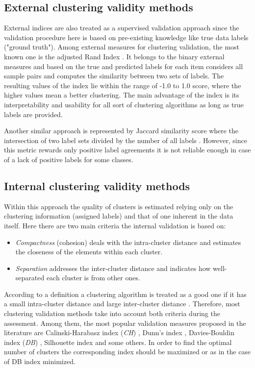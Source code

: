 \documentclass[fontsize=12pt,a4paper,twoside,openany]{scrbook}
\begin{document}
\subsection{External clustering validity methods}
External indices are also treated as a supervised validation approach \parencite{Palacio19} since the validation procedure here is based on pre-existing knowledge like true data labels ("ground truth"). 
Among external measures for clustering validation, the most known one is the adjusted Rand Index \parencite{Hubert85}. It belongs to the binary external measures \parencite{Handl05} and based on the true and predicted labels for each item considers all sample pairs and computes the similarity between two sets of labels. The resulting values of the index lie within the range of -1.0 to 1.0 score, where the higher values mean a better clustering. The main advantage of the index is its interpretability and usability for all sort of clustering algorithms as long as true labels are provided. 

Another similar approach is represented by Jaccard similarity score where the intersection of two label sets divided by the number of all labels \parencite{Arnaboldi15}. However, since this metric rewards only positive label agreements \parencite{Handl05} it is not reliable enough in case of a lack of positive labels for some classes.

\subsection{Internal clustering validity methods}
Within this approach the quality of clusters is estimated relying only on the clustering information (assigned labels) and that of one inherent in the data itself. Here there are two main criteria the internal validation is based on:
\begin{itemize}
  \item \emph{Compactness} (cohesion) deals with the intra-cluster distance and estimates the closeness of the elements within each cluster.
  \item \emph{Separation} addresses the inter-cluster distance and indicates how well-separated each cluster is from other ones.
\end{itemize}
According to a definition a clustering algorithm is treated as a good one if it has a small intra-cluster distance and large inter-cluster distance \parencite{Kim05}. Therefore, most clustering validation methods take into account both criteria during the assessment. Among them, the most popular validation measures proposed in the literature are Calinski-Harabasz index (\emph{CH}) \parencite{Calinski74}, Dunn's index \parencite{Dunn74}, Davies-Bouldin index (\emph{DB}) \parencite{DaviesB79}, Silhouette index \parencite{Rousseeuw87} and some others. In order to find the optimal number of clusters the corresponding index should be maximized or as in the case of DB index minimized.
\end{document}
